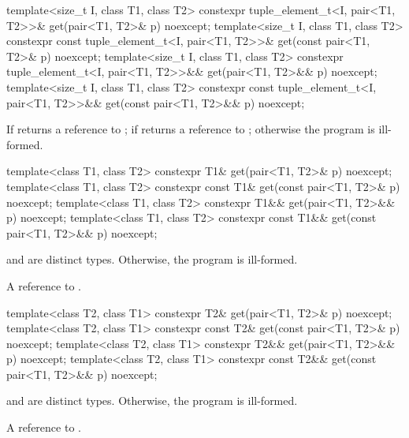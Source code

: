 %
\begin{itemdecl}
template<size_t I, class T1, class T2>
  constexpr tuple_element_t<I, pair<T1, T2>>& get(pair<T1, T2>& p) noexcept;
template<size_t I, class T1, class T2>
  constexpr const tuple_element_t<I, pair<T1, T2>>& get(const pair<T1, T2>& p) noexcept;
template<size_t I, class T1, class T2>
  constexpr tuple_element_t<I, pair<T1, T2>>&& get(pair<T1, T2>&& p) noexcept;
template<size_t I, class T1, class T2>
  constexpr const tuple_element_t<I, pair<T1, T2>>&& get(const pair<T1, T2>&& p) noexcept;
\end{itemdecl}
\begin{itemdescr}

\pnum
\returns If  returns a reference to ;
if  returns a reference to ;
otherwise the program is ill-formed.
\end{itemdescr}

%
\begin{itemdecl}
template<class T1, class T2>
  constexpr T1& get(pair<T1, T2>& p) noexcept;
template<class T1, class T2>
  constexpr const T1& get(const pair<T1, T2>& p) noexcept;
template<class T1, class T2>
  constexpr T1&& get(pair<T1, T2>&& p) noexcept;
template<class T1, class T2>
  constexpr const T1&& get(const pair<T1, T2>&& p) noexcept;
\end{itemdecl}
\begin{itemdescr}
\pnum
\requires {} and  are distinct types. Otherwise, the program is ill-formed.

\pnum
\returns A reference to .
\end{itemdescr}

%
\begin{itemdecl}
template<class T2, class T1>
  constexpr T2& get(pair<T1, T2>& p) noexcept;
template<class T2, class T1>
  constexpr const T2& get(const pair<T1, T2>& p) noexcept;
template<class T2, class T1>
  constexpr T2&& get(pair<T1, T2>&& p) noexcept;
template<class T2, class T1>
  constexpr const T2&& get(const pair<T1, T2>&& p) noexcept;
\end{itemdecl}
\begin{itemdescr}

\pnum
\requires {} and  are distinct types. Otherwise, the program is ill-formed.

\pnum
\returns A reference to .
\end{itemdescr}

